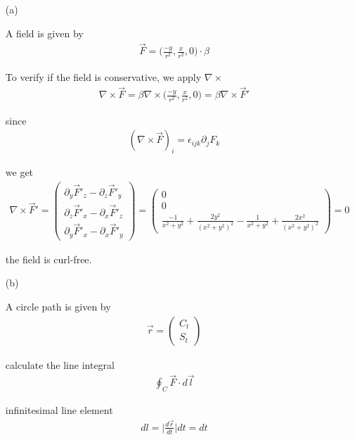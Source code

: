 \documentclass[11pt,a4paper]{article}
\begin{document}
\begin{enumerate}

\item[(a)]

A field is given by
\begin{align}
\vec{F}=\bigg(\frac{-y}{r^2},\frac{x}{r^2},0\bigg)\cdot\beta
\end{align}

To verify if the field is conservative, we apply $\nabla\times$
\begin{align}
\nabla\times\vec{F}=\beta\nabla\times\bigg(\frac{-y}{r^2},\frac{x}{r^2},0\bigg)=\beta\nabla\times\vec{F}'
\end{align}

since
\begin{align}
(\nabla\times\vec{F})_i=\epsilon_{ijk}\partial_j F_k
\end{align}

we get
\begin{align}
\nabla\times\vec{F}'=
\begin{pmatrix}
\partial_y\vec{F}'_z-\partial_z\vec{F}'_y \\
\partial_z\vec{F}'_x-\partial_x\vec{F}'_z \\
\partial_y\vec{F}'_x-\partial_x\vec{F}'_y
\end{pmatrix}=
\begin{pmatrix}
0 \\
0 \\
\frac{-1}{x^2+y^2}+\frac{2y^2}{(x^2+y^2)^2}-\frac{1}{x^2+y^2}+\frac{2x^2}{(x^2+y^2)^2}
\end{pmatrix}=0
\end{align}

the field is curl-free.
\item[(b)]

A circle path is given by
\begin{align}
\vec{r}=
\begin{pmatrix}
C_t \\
S_t
\end{pmatrix}
\end{align}

calculate the line integral
\begin{align}
\oint_C \vec{F}\cdot d\vec{l}
\end{align}

infinitesimal line element
\begin{align}
dl=\bigg|\frac{d\vec{r}}{dt}\bigg|dt=dt
\end{align}


\end{enumerate}
\end{document}
